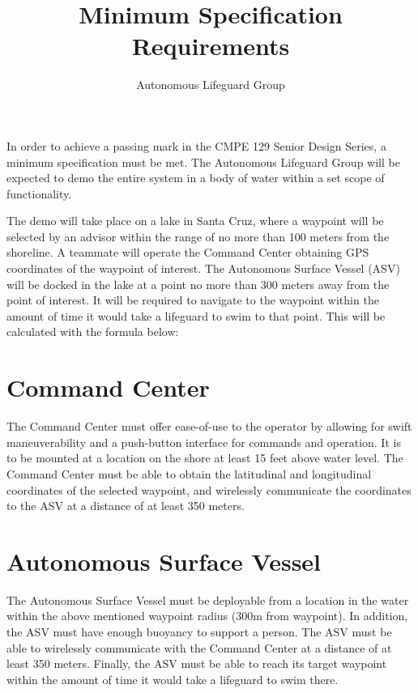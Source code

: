 \documentclass[11pt]{amsart}
\begin{document}
\title{Minimum Specification Requirements}

\author{Autonomous Lifeguard Group}



\maketitle
{
In order to achieve a passing mark in the CMPE 129 Senior Design Series, a minimum specification must be met.
The Autonomous Lifeguard Group will be expected to demo the entire system in a body of water within a set scope of functionality. 

The demo will take place on a lake in Santa Cruz, where a waypoint will be selected by an advisor within the range of no more than 100 meters from the shoreline. A teammate will operate the Command Center obtaining GPS coordinates of the waypoint of interest. The Autonomous Surface Vessel (ASV) will be docked in the lake at a point no more than 300 meters away from the point of interest. It will be required to navigate to the waypoint within the amount of time it would take a lifeguard to swim to that point. This will be calculated with the formula below:

\section{Command Center}
The Command Center must offer ease-of-use to the operator by allowing for swift maneuverability and a push-button interface for commands and operation. It is to be mounted at a location on the shore at least 15 feet above water level. The Command Center must be able to obtain the latitudinal and longitudinal coordinates of the selected waypoint, and wirelessly communicate the coordinates to the ASV at a distance of at least 350 meters.

\section{Autonomous Surface Vessel}
The Autonomous Surface Vessel must be deployable from a location in the water within the above mentioned waypoint radius (300m from waypoint). In addition, the ASV must have enough buoyancy to support a person. The ASV must be able to wirelessly communicate with the Command Center at a distance of at least 350 meters. Finally, the ASV must be able to reach its target waypoint within the amount of time it would take a lifeguard to swim there.


}
\end{document}
